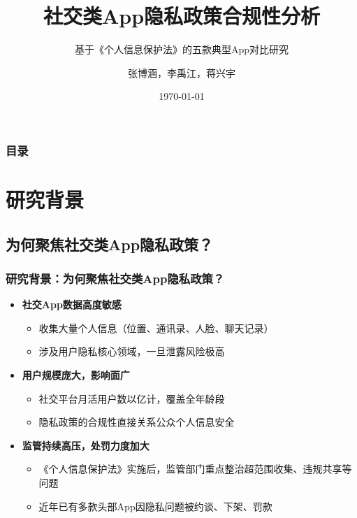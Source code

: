 \documentclass[AutoFakeBold,AutoFakeSlant]{beamer}
\author{张博涵，李禹江，蒋兴宇}
\title{社交类App隐私政策合规性分析}
\subtitle{基于《个人信息保护法》的五款典型App对比研究}
\institute{我的刀盾队}
\date{\today}
\begin{document}
\kaishu

\begin{frame}
    \titlepage
\end{frame}

\begin{frame}
	\frametitle{目录}
	\tableofcontents
\end{frame}

\section{研究背景}
\subsection{为何聚焦社交类App隐私政策？}
\begin{frame}
	\frametitle{研究背景：为何聚焦社交类App隐私政策？}
	\begin{itemize}
		\item \textbf{社交App数据高度敏感}
		\begin{itemize}
			\item 收集大量个人信息（位置、通讯录、人脸、聊天记录）
			\item 涉及用户隐私核心领域，一旦泄露风险极高
		\end{itemize}
		
		\item \textbf{用户规模庞大，影响面广}
		\begin{itemize}
			\item 社交平台月活用户数以亿计，覆盖全年龄段
			\item 隐私政策的合规性直接关系公众个人信息安全
		\end{itemize}
		
		\item \textbf{监管持续高压，处罚力度加大}
		\begin{itemize}
			\item 《个人信息保护法》实施后，监管部门重点整治超范围收集、违规共享等问题
			\item 近年已有多款头部App因隐私问题被约谈、下架、罚款
		\end{itemize}
	\end{itemize}
\end{frame}
\end{document}

